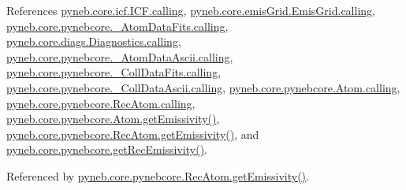References \hyperlink{icf_8py_source_l00016}{pyneb.\+core.\+icf.\+I\+C\+F.\+calling}, \hyperlink{emis_grid_8py_source_l00041}{pyneb.\+core.\+emis\+Grid.\+Emis\+Grid.\+calling}, \hyperlink{pynebcore_8py_source_l00090}{pyneb.\+core.\+pynebcore.\+\_\+\+Atom\+Data\+Fits.\+calling}, \hyperlink{diags_8py_source_l00169}{pyneb.\+core.\+diags.\+Diagnostics.\+calling}, \hyperlink{pynebcore_8py_source_l00311}{pyneb.\+core.\+pynebcore.\+\_\+\+Atom\+Data\+Ascii.\+calling}, \hyperlink{pynebcore_8py_source_l00568}{pyneb.\+core.\+pynebcore.\+\_\+\+Coll\+Data\+Fits.\+calling}, \hyperlink{pynebcore_8py_source_l00918}{pyneb.\+core.\+pynebcore.\+\_\+\+Coll\+Data\+Ascii.\+calling}, \hyperlink{pynebcore_8py_source_l01175}{pyneb.\+core.\+pynebcore.\+Atom.\+calling}, \hyperlink{pynebcore_8py_source_l02572}{pyneb.\+core.\+pynebcore.\+Rec\+Atom.\+calling}, \hyperlink{pynebcore_8py_source_l01716}{pyneb.\+core.\+pynebcore.\+Atom.\+get\+Emissivity()}, \hyperlink{pynebcore_8py_source_l02873}{pyneb.\+core.\+pynebcore.\+Rec\+Atom.\+get\+Emissivity()}, and \hyperlink{pynebcore_8py_source_l03036}{pyneb.\+core.\+pynebcore.\+get\+Rec\+Emissivity()}.



Referenced by \hyperlink{pynebcore_8py_source_l02873}{pyneb.\+core.\+pynebcore.\+Rec\+Atom.\+get\+Emissivity()}.


